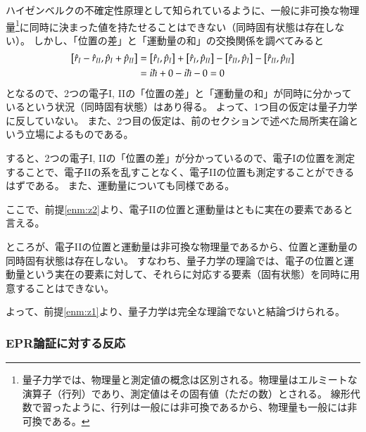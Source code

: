\documentclass[10pt,b5paper,papersize,dvipdfmx]{jsbook}
\begin{document}
ハイゼンベルクの不確定性原理として知られているように、一般に非可換な物理量\footnote{
  量子力学では、物理量と測定値の概念は区別される。物理量はエルミートな演算子（行列）であり、測定値はその固有値（ただの数）とされる。
  線形代数で習ったように、行列は一般には非可換であるから、物理量も一般には非可換である。
}に同時に決まった値を持たせることはできない（同時固有状態は存在しない）。
しかし、「位置の差」と「運動量の和」の交換関係を調べてみると
\begin{align*}
  \comm{\hat r_I - \hat r_{II}}{\hat p_I + \hat p_{II}}
  &= \comm{\hat r_I}{\hat p_I} + \comm{\hat r_I}{\hat p_{II}} - \comm{\hat r_{II}}{\hat p_I} - \comm{\hat r_{II}}{\hat p_{II}} \\
  &= i\hbar + 0 - i\hbar - 0
  = 0
\end{align*}
となるので、2つの電子I, IIの「位置の差」と「運動量の和」が同時に分かっているという状況（同時固有状態）はあり得る。
よって、1つ目の仮定は量子力学に反していない。
また、2つ目の仮定は、前のセクションで述べた局所実在論という立場によるものである。\par
すると、2つの電子I, IIの「位置の差」が分かっているので、電子Iの位置を測定することで、電子IIの系を乱すことなく、電子IIの位置も測定することができるはずである。
また、運動量についても同様である。\par
ここで、前提\ref{enm:z2}より、電子IIの位置と運動量はともに実在の要素であると言える。\par
ところが、電子IIの位置と運動量は非可換な物理量であるから、位置と運動量の同時固有状態は存在しない。
すなわち、量子力学の理論では、電子の位置と運動量という実在の要素に対して、それらに対応する要素（固有状態）を同時に用意することはできない。\par
よって、前提\ref{enm:z1}より、量子力学は完全な理論でないと結論づけられる。

%
\subsubsection{EPR論証に対する反応} %
\end{document}
